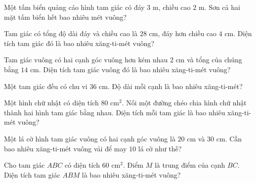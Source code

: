 \begin{ex}
  Một tấm biển quảng cáo hình tam giác có đáy $3\text{ m}$, chiều cao $2\text{ m}$. Sơn cả hai mặt tấm biển hết bao nhiêu mét vuông?
\end{ex}

\begin{ex}
  Tam giác có tổng độ dài đáy và chiều cao là $28\text{ cm}$, đáy hơn chiều cao $4\text{ cm}$. Diện tích tam giác đó là bao nhiêu xăng-ti-mét vuông?
\end{ex}

\begin{ex}
  Tam giác vuông có hai cạnh góc vuông hơn kém nhau $2\text{ cm}$ và tổng của chúng bằng $14\text{ cm}$. Diện tích tam giác vuông đó là bao nhiêu xăng-ti-mét vuông?
\end{ex}

\begin{ex}
  Một tam giác đều có chu vi $36\text{ cm}$. Độ dài mỗi cạnh là bao nhiêu xăng-ti-mét?
\end{ex}

\begin{ex}
  Một hình chữ nhật có diện tích $80\text{ cm}^2$. Nối một đường chéo chia hình chữ nhật thành hai hình tam giác bằng nhau. Diện tích mỗi tam giác là bao nhiêu xăng-ti-mét vuông?
\end{ex}

\begin{ex}
  Một lá cờ hình tam giác vuông có hai cạnh góc vuông là $20\text{ cm}$ và $30\text{ cm}$. Cần bao nhiêu xăng-ti-mét vuông vải để may $10$ lá cờ như thế?
\end{ex}

\begin{ex}
  Cho tam giác $ABC$ có diện tích $60\text{ cm}^2$. Điểm $M$ là trung điểm của cạnh $BC$. Diện tích tam giác $ABM$ là bao nhiêu xăng-ti-mét vuông?
\end{ex}

